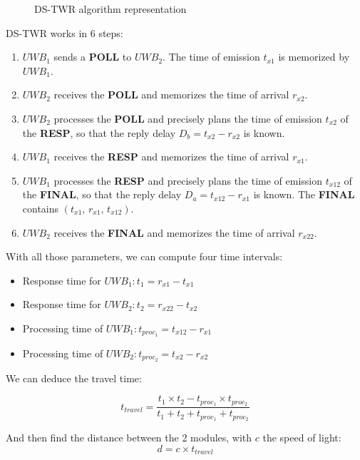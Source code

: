 \documentclass[conference]{IEEEtran}
\begin{document}
\begin{figure}[H]
    \centering
    \resizebox{0.85\linewidth}{!}{\DSTWR}
    \caption{DS-TWR algorithm representation}
    \label{fig:DS-TWR}
\end{figure}

DS-TWR works in 6 steps:
\begin{enumerate}
    \item $UWB_1$ sends a \textbf{POLL} to $UWB_2$. The time of emission
          $t_{x1}$ is memorized by $UWB_1$.
    \item $UWB_2$ receives the \textbf{POLL} and memorizes the time of
          arrival $r_{x2}$.
    \item $UWB_2$ processes the \textbf{POLL} and precisely plans the time
          of emission $t_{x2}$ of the \textbf{RESP}, so that the reply
          delay $D_b = t_{x2} - r_{x2}$ is known.
    \item $UWB_1$ receives the \textbf{RESP} and memorizes the time of
          arrival $r_{x1}$.
    \item $UWB_1$ processes the \textbf{RESP} and precisely plans the time
          of emission $t_{x12}$ of the \textbf{FINAL}, so that the reply
          delay $D_a = t_{x12} - r_{x1}$ is known. The \textbf{FINAL}
          contains $(t_{x1},\, r_{x1},\, t_{x12})$.
    \item $UWB_2$ receives the \textbf{FINAL} and memorizes the time of
          arrival $r_{x22}$.
\end{enumerate}
\newpage
\noindent With all those parameters, we can compute four time intervals:
\begin{itemize}
    \item Response time for $UWB_1 : t_1 = r_{x1} - t_{x1}$
    \item Response time for $UWB_2 : t_2 = r_{x22} - t_{x2}$
    \item Processing time of $UWB_1 : t_{proc_1} = t_{x12} - r_{x1}$
    \item Processing time of $UWB_2 : t_{proc_2} = t_{x2} - r_{x2}$
\end{itemize}

\noindent We can deduce the travel time:

\begin{equation}
\boxed{t_{travel} = \frac{t_1 \times t_2 - t_{proc_1} \times t_{proc_2}}{ t_1 +t_2+t_{proc_1}+t_{proc_2}}}
\end{equation}

\noindent And then find the distance between the 2 modules, with $c$ the speed of light:
\begin{equation}
    d = c \times t_{travel}
\end{equation}
\end{document}
